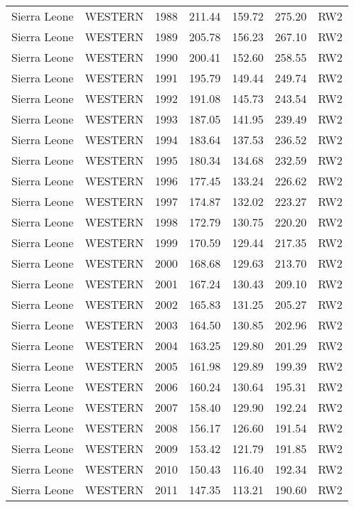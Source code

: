 \begin{longtable}{lllrrrl}
  Sierra Leone & WESTERN & 1988 & 211.44 & 159.72 & 275.20 & RW2 \\ 
  Sierra Leone & WESTERN & 1989 & 205.78 & 156.23 & 267.10 & RW2 \\ 
  Sierra Leone & WESTERN & 1990 & 200.41 & 152.60 & 258.55 & RW2 \\ 
  Sierra Leone & WESTERN & 1991 & 195.79 & 149.44 & 249.74 & RW2 \\ 
  Sierra Leone & WESTERN & 1992 & 191.08 & 145.73 & 243.54 & RW2 \\ 
  Sierra Leone & WESTERN & 1993 & 187.05 & 141.95 & 239.49 & RW2 \\ 
  Sierra Leone & WESTERN & 1994 & 183.64 & 137.53 & 236.52 & RW2 \\ 
  Sierra Leone & WESTERN & 1995 & 180.34 & 134.68 & 232.59 & RW2 \\ 
  Sierra Leone & WESTERN & 1996 & 177.45 & 133.24 & 226.62 & RW2 \\ 
  Sierra Leone & WESTERN & 1997 & 174.87 & 132.02 & 223.27 & RW2 \\ 
  Sierra Leone & WESTERN & 1998 & 172.79 & 130.75 & 220.20 & RW2 \\ 
  Sierra Leone & WESTERN & 1999 & 170.59 & 129.44 & 217.35 & RW2 \\ 
  Sierra Leone & WESTERN & 2000 & 168.68 & 129.63 & 213.70 & RW2 \\ 
  Sierra Leone & WESTERN & 2001 & 167.24 & 130.43 & 209.10 & RW2 \\ 
  Sierra Leone & WESTERN & 2002 & 165.83 & 131.25 & 205.27 & RW2 \\ 
  Sierra Leone & WESTERN & 2003 & 164.50 & 130.85 & 202.96 & RW2 \\ 
  Sierra Leone & WESTERN & 2004 & 163.25 & 129.80 & 201.29 & RW2 \\ 
  Sierra Leone & WESTERN & 2005 & 161.98 & 129.89 & 199.39 & RW2 \\ 
  Sierra Leone & WESTERN & 2006 & 160.24 & 130.64 & 195.31 & RW2 \\ 
  Sierra Leone & WESTERN & 2007 & 158.40 & 129.90 & 192.24 & RW2 \\ 
  Sierra Leone & WESTERN & 2008 & 156.17 & 126.60 & 191.54 & RW2 \\ 
  Sierra Leone & WESTERN & 2009 & 153.42 & 121.79 & 191.85 & RW2 \\ 
  Sierra Leone & WESTERN & 2010 & 150.43 & 116.40 & 192.34 & RW2 \\ 
  Sierra Leone & WESTERN & 2011 & 147.35 & 113.21 & 190.60 & RW2 \\ 

\end{longtable}

